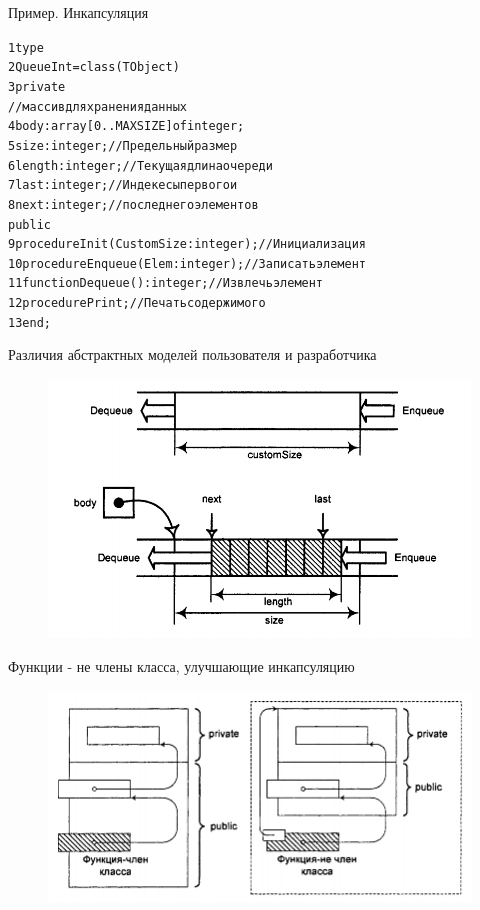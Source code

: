 \documentclass{beamer}
\begin{document}
\begin{frame}[fragile]{Пример. Инкапсуляция}
\begin{alltt}
1 type
2   QueueInt = class(TObject) 
3     private
        //массив для хранения данных
4       body: array[0..MAXSIZE] of integer; 
5       size: integer;   //Предельный размер 
6       length: integer; //Текущая длина очереди
7       last: integer;   //Индекесы первого и                          
8       next: integer;   //последнего элементов
      public                   
9       procedure Init(CustomSize: integer); //Инициализация   
10      procedure Enqueue(Elem: integer); //Записать элемент
11      function Dequeue(): integer; //Извлечь элемент
12      procedure Print; //Печать содержимого
13 end;
\end{alltt}
\end{frame}

\begin{frame}{Различия абстрактных моделей пользователя и разработчика}
\begin{figure}[h]
\centering
\includegraphics[scale=0.5]{images/lec05-pic01.png}
\end{figure}
\end{frame}
  
\begin{frame}{Функции - не члены класса, улучшающие инкапсуляцию}
\begin{figure}[h]
\centering
\includegraphics[scale=0.5]{images/lec05-pic02.png}
\end{figure}
\end{frame}
\end{document}
